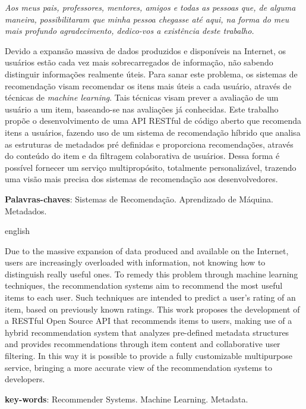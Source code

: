 \documentclass[12pt, openright, oneside, a4paper, brazil]{abntex2}
\begin{document}
\begin{dedicatoria}
	\vspace*{\fill}
	\centering
	\noindent

	\textit{Aos meus pais, professores, mentores, amigos e todas as pessoas que, de alguma maneira, possibilitaram que minha pessoa chegasse até aqui, na forma do meu mais profundo agradecimento, dedico-vos a existência deste trabalho.}

	\vspace*{\fill}
 \end{dedicatoria}

\setlength{\absparsep}{18pt} %
\begin{resumo}

Devido a expansão massiva de dados produzidos e disponíveis na Internet, os usuários estão cada vez mais sobrecarregados de informação, não sabendo distinguir informações realmente úteis. Para sanar este problema, os sistemas de recomendação visam recomendar os itens mais úteis a cada usuário, através de técnicas de \textit{machine learning}. Tais técnicas visam prever a avaliação de um usuário a um item, baseando-se nas avaliações já conhecidas. Este trabalho propõe o desenvolvimento de uma API RESTful de código aberto que recomenda itens a usuários, fazendo uso de um sistema de recomendação híbrido que analisa as estruturas de metadados pré definidas e proporciona recomendações, através do conteúdo do item e da filtragem colaborativa de usuários. Dessa forma é possível fornecer um serviço multipropósito, totalmente personalizável, trazendo uma visão mais precisa dos sistemas de recomendação aos desenvolvedores.

\textbf{Palavras-chaves}: Sistemas de Recomendação. Aprendizado de Máquina. Metadados.
\end{resumo}

\begin{resumo}[Abstract]
\begin{otherlanguage*}{english}

Due to the massive expansion of data produced and available on the Internet, users are increasingly overloaded with information, not knowing how to distinguish really useful ones. To remedy this problem through machine learning techniques, the recommendation systems aim to recommend the most useful items to each user. Such techniques are intended to predict a user's rating of an item, based on previously known ratings. This work proposes the development of a RESTful Open Source API that recommends items to users, making use of a hybrid recommendation system that analyzes pre-defined metadata structures and provides recommendations through item content and collaborative user filtering. In this way it is possible to provide a fully customizable multipurpose service, bringing a more accurate view of the recommendation systems to developers.

\textbf{key-words}: Recommender Systems. Machine Learning. Metadata.
\end{otherlanguage*}
\end{resumo}
\end{document}

